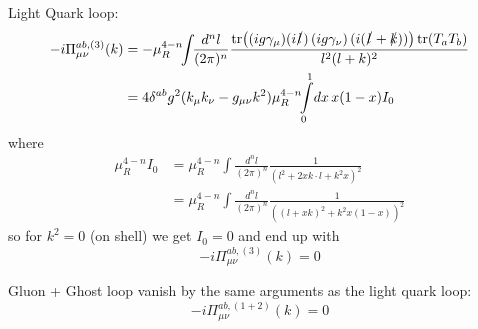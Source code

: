 Light Quark loop:
\begin{align}
-i\Pi_{\mu\nu}^{ab,(3)}(k) &= -\mu_R^{4-n}\!\!\int\!\!\frac{d^nl}{(2\pi)^n} \frac{\tr\!\left((ig\gamma_\mu)(i\slashed l)\left(ig\gamma_\nu\right)(i(\slashed l + \slashed k))\right)\tr(T_aT_b)}{l^2(l+k)^2}\\
 &= 4\delta^{ab}g^2(k_\mu k_\nu - g_{\mu\nu}k^2) \mu_R^{4-n}\!\!\int\limits_0^1\!dx\,x(1-x)I_0
\end{align}
where
\begin{align}
\mu_R^{4-n}I_0 &= \mu_R^{4-n}\!\!\int\!\!\frac{d^nl}{(2\pi)^n} \frac 1 {(l^2+2xk\cdot l+k^2x)^2}\\
 &= \mu_R^{4-n}\!\!\int\!\!\frac{d^nl}{(2\pi)^n} \frac 1 {((l+xk)^2+k^2x(1-x))^2}
\end{align}
so for $k^2=0$ (on shell) we get $I_0 = 0$ and end up with
\begin{equation}
-i\Pi_{\mu\nu}^{ab,(3)}(k) = 0
\end{equation}

Gluon + Ghost loop vanish by the same arguments as the light quark loop:
\begin{equation}
-i\Pi_{\mu\nu}^{ab,(1+2)}(k) = 0
\end{equation}
